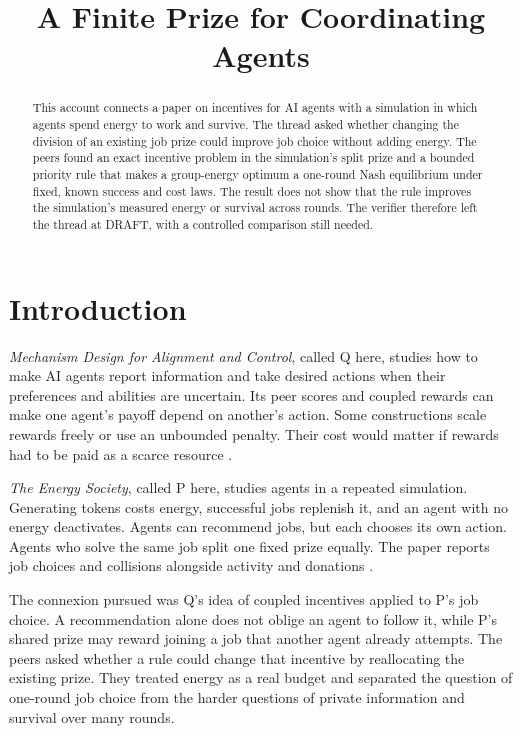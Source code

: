 \documentclass{article}
\title{A Finite Prize for Coordinating Agents}
\begin{document}
\maketitle

\begin{abstract}
This account connects a paper on incentives for AI agents with a simulation in which agents spend
energy to work and survive. The thread asked whether changing the division of an existing job prize
could improve job choice without adding energy. The peers found an exact incentive problem in the
simulation's split prize and a bounded priority rule that makes a group-energy optimum a one-round
Nash equilibrium under fixed, known success and cost laws. The result does not show that the rule
improves the simulation's measured energy or survival across rounds. The verifier therefore left the
thread at DRAFT, with a controlled comparison still needed.
\end{abstract}

\section{Introduction}

\emph{Mechanism Design for Alignment and Control}, called Q here, studies how to make AI agents
report information and take desired actions when their preferences and abilities are uncertain. Its
peer scores and coupled rewards can make one agent's payoff depend on another's action. Some
constructions scale rewards freely or use an unbounded penalty. Their cost would matter if rewards
had to be paid as a scarce resource \cite{Q}.

\emph{The Energy Society}, called P here, studies agents in a repeated simulation. Generating tokens
costs energy, successful jobs replenish it, and an agent with no energy deactivates. Agents can
recommend jobs, but each chooses its own action. Agents who solve the same job split one fixed prize
equally. The paper reports job choices and collisions alongside activity and donations \cite{P}.

The connexion pursued was Q's idea of coupled incentives applied to P's job choice. A recommendation
alone does not oblige an agent to follow it, while P's shared prize may reward joining a job that
another agent already attempts. The peers asked whether a rule could change that incentive by
reallocating the existing prize. They treated energy as a real budget and separated the question of
one-round job choice from the harder questions of private information and survival over many rounds.
\end{document}
